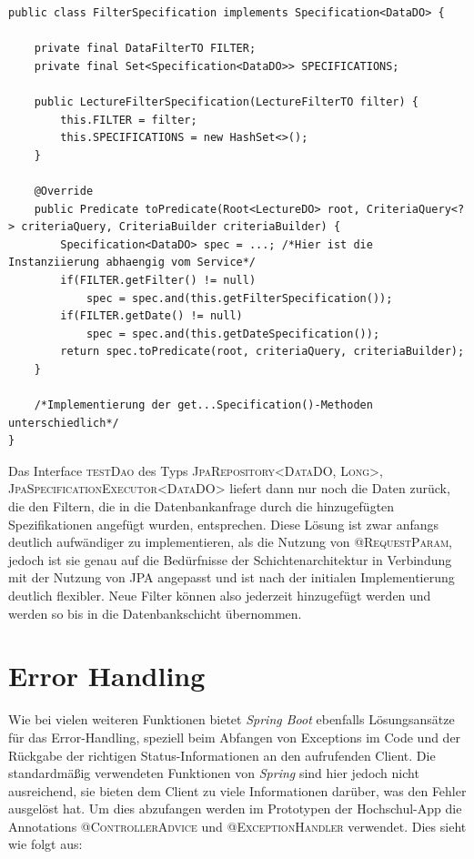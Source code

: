 \begin{lstlisting}[caption={Spezifikation der Filter für Datenbankanfrage}]
public class FilterSpecification implements Specification<DataDO> {

    private final DataFilterTO FILTER;
    private final Set<Specification<DataDO>> SPECIFICATIONS;
    
    public LectureFilterSpecification(LectureFilterTO filter) {
        this.FILTER = filter;
        this.SPECIFICATIONS = new HashSet<>();
    }
   
    @Override
    public Predicate toPredicate(Root<LectureDO> root, CriteriaQuery<?> criteriaQuery, CriteriaBuilder criteriaBuilder) {
        Specification<DataDO> spec = ...; /*Hier ist die Instanziierung abhaengig vom Service*/
        if(FILTER.getFilter() != null)
            spec = spec.and(this.getFilterSpecification());
        if(FILTER.getDate() != null)
            spec = spec.and(this.getDateSpecification());
        return spec.toPredicate(root, criteriaQuery, criteriaBuilder);
    }
    
    /*Implementierung der get...Specification()-Methoden unterschiedlich*/
}
\end{lstlisting}

Das Interface \textsc{testDao} des Typs \textsc{JpaRepository<DataDO, Long>, JpaSpecificationExecutor<DataDO>} liefert dann nur noch die Daten zurück, die den Filtern, die in die Datenbankanfrage durch die hinzugefügten Spezifikationen angefügt wurden, entsprechen. Diese Lösung ist zwar anfangs deutlich aufwändiger zu implementieren, als die Nutzung von \textsc{@RequestParam}, jedoch ist sie genau auf die Bedürfnisse der Schichtenarchitektur in Verbindung mit der Nutzung von \ac{JPA} angepasst und ist nach der initialen Implementierung deutlich flexibler. Neue Filter können also jederzeit hinzugefügt werden und werden so bis in die Datenbankschicht übernommen.

\section{Error Handling}

Wie bei vielen weiteren Funktionen bietet \textit{Spring Boot} ebenfalls Lösungsansätze für das Error-Handling, speziell beim Abfangen von Exceptions im Code und der Rückgabe der richtigen Status-Informationen an den aufrufenden Client. Die standardmäßig verwendeten Funktionen von \textit{Spring} sind hier jedoch nicht ausreichend, sie bieten dem Client zu viele Informationen darüber, was den Fehler ausgelöst hat. Um dies abzufangen werden im Prototypen der Hochschul-\ac{App} die Annotations \textsc{@ControllerAdvice} und \textsc{@ExceptionHandler} verwendet. Dies sieht wie folgt aus:

